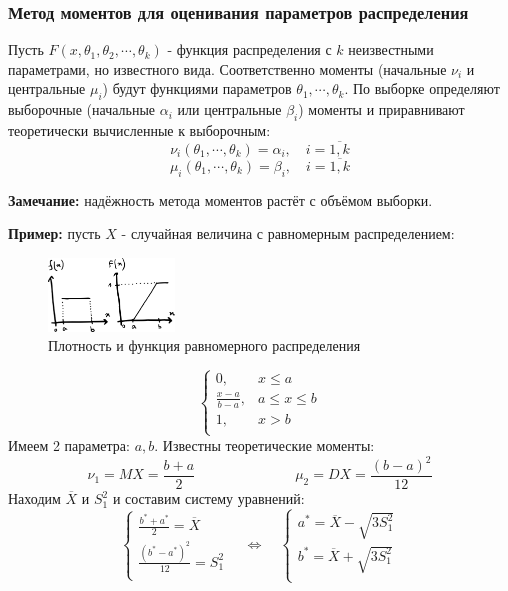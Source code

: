 \documentclass[12pt, a4paper]{article}
\begin{document}
\subsubsection{Метод моментов для оценивания параметров распределения}
Пусть $F(x, \theta_1, \theta_2, \cdots, \theta_k)$ - функция распределения с $k$ неизвестными параметрами, но известного вида. Соответственно моменты (начальные $\nu_i$ и центральные $\mu_i$) будут функциями параметров $\theta_1, \cdots, \theta_k$. По выборке определяют выборочные (начальные $\alpha_i$ или центральные $\beta_i$) моменты и приравнивают теоретически вычисленные к выборочным:
\[\nu_i(\theta_1, \cdots, \theta_k) = \alpha_i, \quad i = \overline{1, k} \]
\[\mu_i(\theta_1, \cdots, \theta_k) = \beta_i, \quad i = \overline{1, k} \]

\textbf{Замечание:} надёжность метода моментов растёт с объёмом выборки.

\textbf{Пример:} пусть $X$ - случайная величина с равномерным распределением:
\begin{figure}
  \centering
  \vspace{5mm}
  \includegraphics[width=0.3\textwidth]{01}
  \vspace{-4mm}
  \caption{Плотность и функция равномерного распределения}
\end{figure}
\[\begin{cases} 0, & x \leq a \\
\frac{x-a}{b-a}, & a \leq x \leq b \\
1, & x > b \\
\end{cases} \]
Имеем 2 параметра: $a, b$. Известны теоретические моменты:
\[\nu_1 = MX = \frac{b+a}{2} \hspace{3cm} \mu_2 = DX = \frac{(b-a)^2}{12} \]
Находим $\overline{X}$ и $S^2_1$ и составим систему уравнений:
\[\begin{cases} \frac{b^* + a^*}{2} = \overline{X} \\
\frac{(b^* - a^*)^2}{12} = S^2_1 \\
\end{cases} \quad \Leftrightarrow \quad
\begin{cases} a^* = \overline{X} - \sqrt{3S_1^2} \\
b^* = \overline{X} + \sqrt{3S_1^2} \\
\end{cases} \]
\end{document}
